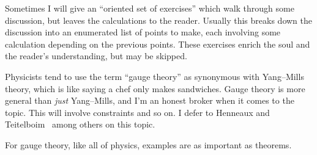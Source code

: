 Sometimes I will give an ``oriented set of exercises'' which walk
through some discussion, but leaves the calculations to the
reader. Usually this breaks down the discussion into an enumerated list
of points to make, each involving some calculation depending on the
previous points. These exercises enrich the soul and the reader's
understanding, but may be skipped.

Physicists tend to use the term ``gauge theory'' as synonymous with
Yang--Mills theory, which is like saying a chef only makes sandwiches.
Gauge theory is more general than \emph{just} Yang--Mills, and I'm an
honest broker when it comes to the topic. This will involve constraints
and so on. I defer to Henneaux and Teitelboim~\cite{Henneaux:1992ig}
among others on this topic.

For gauge theory, like all of physics, examples are as important as
theorems. 